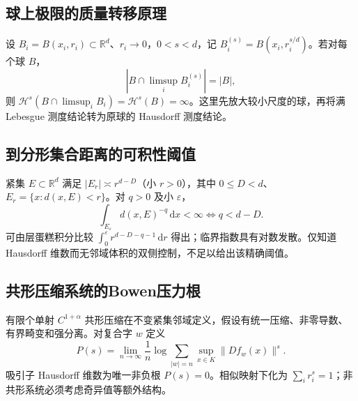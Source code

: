 \documentclass[../main.tex]{subfiles}
\begin{document}
\subsection{球上极限的质量转移原理}
设 $B_i=B(x_i,r_i)\subset\mathbb R^d$、$r_i\to0$，$0<s<d$，记 $B_i^{(s)}=B(x_i,r_i^{s/d})$。若对每个球 $B$，
\[
|B\cap\limsup_iB_i^{(s)}|=|B|,
\]
则 $\mathcal H^s(B\cap\limsup_iB_i)=\mathcal H^s(B)=\infty$。这里先放大较小尺度的球，再将满 Lebesgue 测度结论转为原球的 Hausdorff 测度结论。
\subsection{到分形集合距离的可积性阈值}
紧集 $E\subset\mathbb R^d$ 满足 $|E_r|\asymp r^{d-D}$（小 $r>0$），其中 $0\le D<d$、$E_r=\{x:d(x,E)<r\}$。对 $q>0$ 及小 $\varepsilon$，
\[
\int_{E_\varepsilon}d(x,E)^{-q}\,\mathrm dx<\infty
\iff q<d-D.
\]
可由层蛋糕积分比较 $\int_0^\varepsilon r^{d-D-q-1}\,\mathrm dr$ 得出；临界指数具有对数发散。仅知道 Hausdorff 维数而无邻域体积的双侧控制，不足以给出该精确阈值。
\subsection{共形压缩系统的Bowen压力根}
有限个单射 $C^{1+\alpha}$ 共形压缩在不变紧集邻域定义，假设有统一压缩、非零导数、有界畸变和强分离。对复合字 $w$ 定义
\[
P(s)=\lim_{n\to\infty}\frac1n\log
\sum_{|w|=n}\sup_{x\in K}\|Df_w(x)\|^s.
\]
吸引子 Hausdorff 维数为唯一非负根 $P(s)=0$。相似映射下化为 $\sum_i r_i^s=1$；非共形系统必须考虑奇异值等额外结构。
\clearpage
\end{document}
